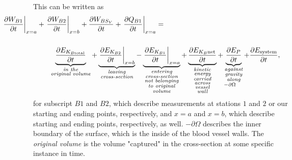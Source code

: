 \documentclass[12pt, a4paper]{article}
\theoremstyle{definition}
\theoremstyle{remark}
\theoremstyle{definition}
\newcommand{\?}{\stackrel{?}{=}}
\renewcommand{\it}[1]{\textit{#1}}
\begin{document}
\noindent This can be written as
\begin{equation}
\begin{multlined}
\hspace{-0.8in}
\left. \frac{\partial{W}_{B1}}{\partial t} \right|_{x=a} 
+ \left. \frac{\partial {W}_{B2}}{\partial t} \right|_{x=b}
 + \frac{\partial {W}_{BS_V}}{\partial t}
 + \left. \frac{\partial {Q}_{B1}}{\partial t} \right|_{x=a} = \\ \\ 
\underbrace{\frac{\partial {E}_{K_{B \text{total}}}}{\partial t}}_{\substack{\it{in the} \\ \it{original volume}}}
 + \underbrace{\left. \frac{\partial {E}_{K_{B2}}}{\partial t} \right|_{x=b}}_{\substack{\it{leaving} \\ \it{cross-section}}}
 - \underbrace{\left. \frac{\partial {E}_{K_{B1}}}{\partial t} \right|_{x=a}}_{\substack{\it{entering} \\ \it{cross-section} \\ \it{not belonging} \\ \it{to original} \\ \it{volume}}}
 +\underbrace{\frac{\partial {E}_{{K}_{B}\text{net}}}{\partial t}}_{\substack{\it{kinetic} \\ \it{energy} \\ \it{carried} \\ \it{across} \\ \it{vessel} \\ \it{wall}}}
 +\underbrace{\frac{\partial {E}_{P}}{\partial t}}_{\substack{\it{against} \\ \it{gravity} \\ \it{along} \\ \hspace{-0.15in} -\partial \Omega }}
 + \frac{\partial {E}_{\text{system}}}{\partial t}, 
\end{multlined}
\end{equation}
 for subscript $B1$ and $B2$, which describe measurements at stations $1$ and $2$ or our starting and ending points, respectively, and $x=a$ and $x=b$, which describe starting and ending points, respectively, as well. $-\partial \Omega$ describes the inner boundary of the surface, which is the inside of the blood vessel walls. The \it{original volume} is the volume "captured" in the cross-section at some specific instance in time. \\
\end{document}
